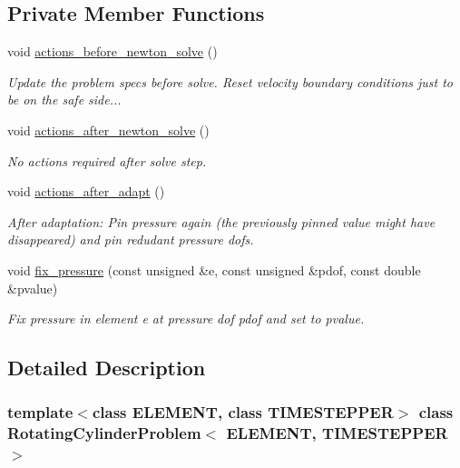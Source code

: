 \subsection*{Private Member Functions}
\begin{DoxyCompactItemize}
\item 
void \hyperlink{classRotatingCylinderProblem_af6678f4329624865484d52058d8902a3}{actions\+\_\+before\+\_\+newton\+\_\+solve} ()
\begin{DoxyCompactList}\small\item\em Update the problem specs before solve. Reset velocity boundary conditions just to be on the safe side... \end{DoxyCompactList}\item 
void \hyperlink{classRotatingCylinderProblem_a2cac6acd0607a98fd1b5f2c155335dbd}{actions\+\_\+after\+\_\+newton\+\_\+solve} ()
\begin{DoxyCompactList}\small\item\em No actions required after solve step. \end{DoxyCompactList}\item 
void \hyperlink{classRotatingCylinderProblem_a7d2fc60789ca6e2458be45b94ee40a1c}{actions\+\_\+after\+\_\+adapt} ()
\begin{DoxyCompactList}\small\item\em After adaptation\+: Pin pressure again (the previously pinned value might have disappeared) and pin redudant pressure dofs. \end{DoxyCompactList}\item 
void \hyperlink{classRotatingCylinderProblem_a06a4c2a32a64bb6c0e6cf7a9e3bba157}{fix\+\_\+pressure} (const unsigned \&e, const unsigned \&pdof, const double \&pvalue)
\begin{DoxyCompactList}\small\item\em Fix pressure in element e at pressure dof pdof and set to pvalue. \end{DoxyCompactList}\end{DoxyCompactItemize}


\subsection{Detailed Description}
\subsubsection*{template$<$class E\+L\+E\+M\+E\+NT, class T\+I\+M\+E\+S\+T\+E\+P\+P\+ER$>$\newline
class Rotating\+Cylinder\+Problem$<$ E\+L\+E\+M\+E\+N\+T, T\+I\+M\+E\+S\+T\+E\+P\+P\+E\+R $>$}

